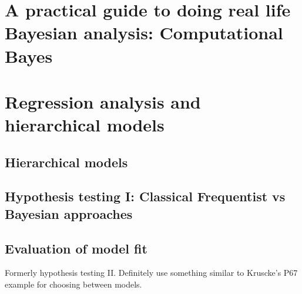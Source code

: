 \documentclass[11pt,fullpage]{book}
\begin{document}
\part{A practical guide to doing real life Bayesian analysis: Computational Bayes}\label{part:computationalBayes}


\part{Regression analysis and hierarchical models}
\chapter{Hierarchical models}\label{chap:hierarchicalModels}
\chapter{Hypothesis testing I: Classical Frequentist vs Bayesian approaches}

\chapter{Evaluation of model fit}\label{chap:ModelFit}
Formerly hypothesis testing II. Definitely use something similar to Kruscke's P67 example for choosing between models.






\end{document}
